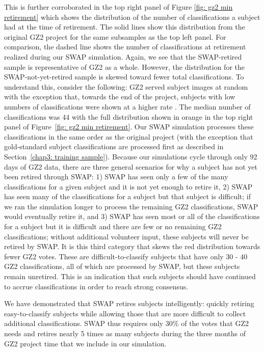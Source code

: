 This is further corroborated in the top right panel of Figure \ref{fig: gz2 min retirement} which shows the distribution of the number of classifications a subject had at the time of retirement. The solid lines show this distribution from the original GZ2 project for the same subsamples as the top left panel. For comparison, the dashed line shows the number of classifications at retirement realized during our SWAP simulation. Again, we see that the SWAP-retired sample is representative of GZ2 as a whole. However, the distribution for the SWAP-not-yet-retired sample is skewed toward fewer total classifications. To understand this, consider the following: GZ2 served subject images at random with the  exception that, towards the end of the project, subjects with low numbers of classifications were shown at a higher rate \citep{Willett2013}. The median number of classifications was 44 with the full distribution shown in orange in the top right panel of Figure~\ref{fig: gz2 min retirement}. Our SWAP simulation processes these classifications in the same order as the original project (with the exception that gold-standard subject classifications are processed first as described in Section~\ref{chap3: training sample}). Because our simulations cycle through only 92 days of GZ2 data, there are three general scenarios for why a subject has not yet been retired through SWAP: 1) SWAP has seen only a few of the many classifications for a given subject and it is not yet enough to retire it, 2) SWAP has seen many of the classifications for a subject but that subject is difficult; if we ran the simulation longer to process the remaining GZ2 classifications, SWAP would eventually retire it, and 3) SWAP has seen most or all of the classifications for a subject but it is difficult and there are few or no remaining GZ2 classifications; without additional volunteer input, these subjects will never be retired by SWAP. It is this third category that skews the red distribution towards fewer GZ2 votes. These are difficult-to-classify subjects that have only 30 - 40 GZ2 classifications, all of which are processed by SWAP, but these subjects remain unretired. This is an indication that such subjects should have continued to accrue classifications in order to reach strong consensus.

We have demonstrated that SWAP retires subjects intelligently: quickly retiring easy-to-classify subjects while allowing those that are more difficult to collect additional classifications. SWAP thus requires only 30\% of the votes that GZ2 needs and retires nearly 5 times as many subjects during the three months of GZ2 project time that we include in our simulation.


